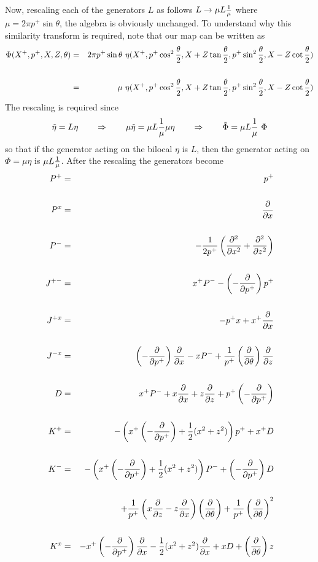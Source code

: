 \documentclass[a4paper,12pt]{article}
\begin{document}
\begin{appendix}
\begin{eqnarray}
\end{eqnarray}
%
Now, rescaling each of the generators $L$ as follows $L\to \mu L{1\over\mu}$ where $\mu =2\pi p^+\sin\theta$, the algebra 
is obviously unchanged. 
To understand why this similarity transform is required, note that our map can be written as
%
\begin{eqnarray}
\Phi(X^+,p^+,X,Z,\theta) &=& 2\pi
p^+\sin\theta\,\, \eta(X^+, p^+\cos^2{\theta\over 2},X+Z \tan{\theta\over 2}, 
p^+\sin^2{\theta\over 2},X-Z\cot {\theta \over 2})
\cr\cr
&=&\mu\,\, \eta(X^+, p^+\cos^2{\theta\over 2},X+Z\tan{\theta\over 2}, 
p^+\sin^2{\theta\over 2},X-Z\cot{\theta\over 2})
\end{eqnarray}
%
The rescaling is required since
%
\begin{eqnarray}
\tilde\eta=L\eta\qquad\Rightarrow\qquad\mu\tilde\eta =\mu L {1\over \mu}\mu\eta\qquad
\Rightarrow\qquad\tilde\Phi =\mu L {1\over \mu}\,\,\Phi
\end{eqnarray}
% 
so that if the generator acting on the bilocal $\eta$ is $L$, then the generator acting on $\Phi=\mu\eta$ is $\mu L {1\over \mu}$.
After the rescaling the generators become 
%
\begin{eqnarray}
P^{+} & = & p^{+} \cr\cr
P^{x} & = & \frac{\partial}{\partial x} \cr\cr
P^{-} & = & -\frac{1}{2 p^{+}} \left( \frac{\partial^2}{\partial x^2} + \frac{\partial^2}{\partial z^2}
 \right) \cr\cr
J^{+-} & = & x^{+} P^{-} - \left(- \frac{\partial}{\partial p^{+}} \right)p^{+} \cr\cr
J^{+x} & = & - p^{+} x + x^{+} \frac{\partial}{\partial x} \cr\cr
J^{-x} & = & \left(- \frac{\partial}{\partial p^{+}}\right)\frac{\partial}{\partial x} - x P^{-}  + \frac{1}{p^{+}}\left( \frac{\partial}{\partial \theta}\right) \frac{\partial}{\partial z} \cr\cr
D & = & x^{+} P^{-} + x \frac{\partial}{\partial x} + z \frac{\partial}{\partial z} + p^{+}\left(-\frac{\partial}{\partial p^{+}}
\right) \cr\cr
K^{+} & = &  -\left( x^{+}\left(-\frac{\partial}{\partial p^{+}}\right) + \frac{1}{2} (x^2 + z^2)\right) p^{+} + x^{+} D \cr\cr
K^{-} & = & - \left( x^{+}\left(-\frac{\partial}{\partial p^{+}} \right)   + \frac{1}{2}(x^2 + z^2) \right)P^{-} + \left(- \frac{\partial}{\partial p^{+}} \right)D  \cr\cr 
& & + \frac{1}{p^{+}}  \left( x\frac{\partial}{\partial z} - z\frac{\partial}{\partial x}\right)\left( \frac{\partial}{\partial \theta} \right) + \frac{1}{p^{+}}\left( \frac{\partial}{\partial \theta}\right)^2    \cr\cr
K^{x} &=& - x^{+}\left(- \frac{\partial}{\partial p^{+}} \right) \frac{\partial}{\partial x} - \frac{1}{2}(x^2 + z^2) \frac{\partial }{\partial x}  + x D +  \left(\frac{\partial}{ \partial \theta}\right) z \cr\cr

\end{eqnarray}
\end{appendix}
\end{document}
